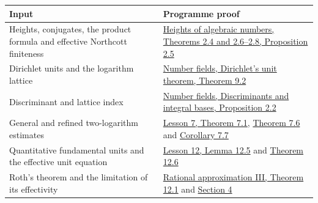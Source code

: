 \documentclass[
  11pt,
  a4paper,
]{article}
\newcounter{none} %
\begin{document}
{\def\LTcaptype{none} %
\begin{longtable}[]{@{}
  >{\raggedright\arraybackslash}p{}
  >{\raggedright\arraybackslash}p{}@{}}
\toprule\noalign{}
\begin{minipage}[b]{\linewidth}\raggedright
Input
\end{minipage} & \begin{minipage}[b]{\linewidth}\raggedright
Programme proof
\end{minipage} \\
\midrule\noalign{}
\endhead
\bottomrule\noalign{}
\endlastfoot
Heights, conjugates, the product formula and effective Northcott
finiteness & \href{https://kokunoyumeto.github.io/open-math-courses-public/courses/TR-TRANS/TR-TRANS-02.html}{Heights of algebraic
numbers, Theorems 2.4 and 2.6--2.8, Proposition 2.5} \\
Dirichlet units and the logarithm lattice &
\href{https://kokunoyumeto.github.io/open-math-courses-public/courses/NT-ANT/dirichlets-unit-theorem.html\#producing-enough-units}{Number
fields, Dirichlet's unit theorem, Theorem 9.2} \\
Discriminant and lattice index &
\href{https://kokunoyumeto.github.io/open-math-courses-public/courses/NT-ANT/discriminants-and-integral-bases.html}{Number fields,
Discriminants and integral bases, Proposition 2.2} \\
General and refined two-logarithm estimates &
\href{https://kokunoyumeto.github.io/open-math-courses-public/courses/TR-BAKER/TR-BAKER-07.html\#1-an-explicit-bound-without-multiplicative-independence}{Lesson
7, Theorem 7.1},
\href{https://kokunoyumeto.github.io/open-math-courses-public/courses/TR-BAKER/TR-BAKER-07.html\#11-a-sharper-bound-when-the-real-bases-are-close-to-one}{Theorem
7.6} and
\href{https://kokunoyumeto.github.io/open-math-courses-public/courses/TR-BAKER/TR-BAKER-07.html\#12-a-rational-number-close-to-one}{Corollary
7.7} \\
Quantitative fundamental units and the effective unit equation &
\href{https://kokunoyumeto.github.io/open-math-courses-public/courses/TR-BAKER/TR-BAKER-12.html\#4-effective-control-of-a-fundamental-system}{Lesson
12, Lemma 12.5} and
\href{https://kokunoyumeto.github.io/open-math-courses-public/courses/TR-BAKER/TR-BAKER-12.html\#5-the-effective-unit-equation}{Theorem
12.6} \\
Roth's theorem and the limitation of its effectivity &
\href{https://kokunoyumeto.github.io/open-math-courses-public/courses/TR-TRANS/TR-TRANS-12.html\#theorem-12-1-roth-s-theorem}{Rational
approximation III, Theorem 12.1} and
\href{https://kokunoyumeto.github.io/open-math-courses-public/courses/TR-TRANS/TR-TRANS-12.html\#4-why-the-proof-gives-finiteness-without-a-denominator-bound}{Section
4} \\
\end{longtable}
}
\end{document}

